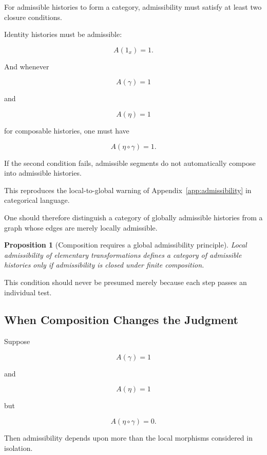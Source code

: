 \documentclass[
  11pt,
  a4paper,
  DIV=12,
  BCOR=0mm,
  parskip=half-
]{scrartcl}
\theoremstyle{definition}
\theoremstyle{plain}
\newtheorem{proposition}[definition]{Proposition}
\theoremstyle{remark}
\begin{document}
For admissible histories to form a category, admissibility must satisfy at
least two closure conditions.

Identity histories must be admissible:

\[
  A(1_x)=1.
\]

And whenever

\[
  A(\gamma)=1
\]

and

\[
  A(\eta)=1
\]

for composable histories, one must have

\[
  A(\eta\circ\gamma)=1.
\]

If the second condition fails, admissible segments do not automatically
compose into admissible histories.

This reproduces the local-to-global warning of
Appendix~\ref{app:admissibility} in categorical language.

One should therefore distinguish a category of globally admissible histories
from a graph whose edges are merely locally admissible.

\begin{proposition}[Composition requires a global admissibility principle]
\label{prop:admissibility-composition}
Local admissibility of elementary transformations defines a category of
admissible histories only if admissibility is closed under finite
composition.
\end{proposition}

This condition should never be presumed merely because each step passes an
individual test.


\subsection{When Composition Changes the Judgment}
\label{app:history-dependent-admissibility}

Suppose

\[
  A(\gamma)=1
\]

and

\[
  A(\eta)=1
\]

but

\[
  A(\eta\circ\gamma)=0.
\]

Then admissibility depends upon more than the local morphisms considered in
isolation.
\end{document}
